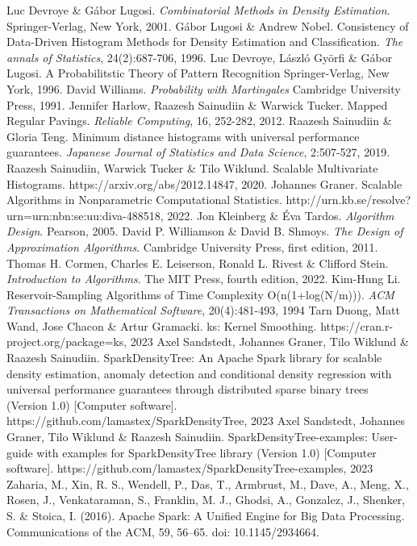 \documentclass{report}
\begin{document}
\begingroup
	\begin{thebibliography}{9}
			Luc Devroye \& Gábor Lugosi.
			\textit{Combinatorial Methods in Density Estimation}.
			Springer-Verlag, New York, 2001.
			Gábor Lugosi \& Andrew Nobel.
			Consistency of Data-Driven Histogram Methods for Density Estimation and Classification.
			\textit{The annals of Statistics}, 24(2):687-706, 1996.
			Luc Devroye, László Györfi \& Gábor Lugosi.
			A Probabilitstic Theory of Pattern Recognition
			Springer-Verlag, New York, 1996.
			David Williams.
			\textit{Probability with Martingales}
			Cambridge University Press, 1991.
			Jennifer Harlow, Raazesh Sainudiin \& Warwick Tucker.
			Mapped Regular Pavings.
			\textit{Reliable Computing}, 16, 252-282, 2012.
			Raazesh Sainudiin \& Gloria Teng.
			Minimum distance histograms with universal performance guarantees.
			\textit{Japanese Journal of Statistics and Data Science}, 2:507-527, 2019.
			Raazesh Sainudiin, Warwick Tucker \& Tilo Wiklund.
			Scalable Multivariate Histograms.
			https://arxiv.org/abs/2012.14847, 2020.
			Johannes Graner.
			Scalable Algorithms in Nonparametric Computational Statistics.
			http://urn.kb.se/resolve?urn=urn:nbn:se:uu:diva-488518, 2022.
			Jon Kleinberg \& Éva Tardos.
			\textit{Algorithm Design}.
			Pearson, 2005.
			David P. Williamson \& David B. Shmoys.
			\textit{The Design of Approximation Algorithms}.
			Cambridge University Press, first edition, 2011.
		Thomas H. Cormen, Charles E. Leiserson, Ronald L. Rivest \& Clifford Stein.
			\textit{Introduction to Algorithms}.
			The MIT Press, fourth edition, 2022.
			Kim-Hung Li.
			Reservoir-Sampling Algorithms of Time Complexity O(n(1+log(N/m))).
			\textit{ACM Transactions on Mathematical Software}, 20(4):481-493, 1994
                Tarn Duong, Matt Wand, Jose Chacon \& Artur Gramacki.
			ks: Kernel Smoothing.
			https://cran.r-project.org/package=ks, 2023
			Axel Sandstedt, Johannes Graner, Tilo Wiklund \& Raazesh Sainudiin.
    {SparkDensityTree: An Apache Spark library for scalable density estimation, anomaly detection and conditional density regression with universal performance guarantees through distributed sparse binary trees (Version 1.0) [Computer software].} https://github.com/lamastex/SparkDensityTree, 2023
		Axel Sandstedt, Johannes Graner, Tilo Wiklund \& Raazesh Sainudiin.
	{SparkDensityTree-examples: User-guide with examples for SparkDensityTree library (Version 1.0) [Computer software].} https://github.com/lamastex/SparkDensityTree-examples, 2023
  Zaharia, M., Xin, R. S., Wendell, P., Das, T., Armbrust, M., Dave, A., Meng, X., Rosen, J., Venkataraman, S., Franklin, M. J., Ghodsi, A., Gonzalez, J., Shenker, S. \& Stoica, I. (2016). 
  Apache Spark: A Unified Engine for Big Data Processing. Communications of the ACM, 59, 56--65. doi: 10.1145/2934664.
  \end{thebibliography}
\endgroup
\end{document}
